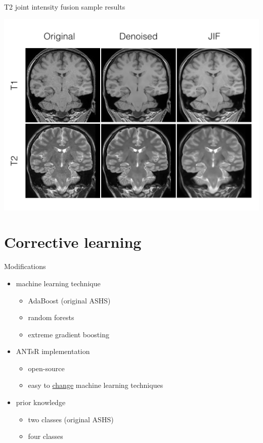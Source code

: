\documentclass[ignorenonframetext,]{beamer}
\providecommand{\tightlist}{%
\setlength{\itemsep}{0pt}\setlength{\parskip}{0pt}}
\begin{document}
\begin{frame}{T2 joint intensity fusion sample results}

\centering
\includegraphics[width=0.85 \textwidth]{../Figures/jifResults.png}

\end{frame}

\section{Corrective learning}\label{corrective-learning}

\begin{frame}{Modifications}

\begin{itemize}
\tightlist
\item
  machine learning technique

  \begin{itemize}
  \tightlist
  \item
    AdaBoost (original ASHS)
  \item
    random forests
  \item
    extreme gradient boosting
  \end{itemize}
\item
  ANTsR implementation

  \begin{itemize}
  \tightlist
  \item
    open-source
  \item
    easy to
    \href{https://github.com/stnava/ANTsR/blob/master/R/segmentationRefinement.R\#L375-L413}{change}
    machine learning techniques
  \end{itemize}
\item
  prior knowledge

  \begin{itemize}
  \tightlist
  \item
    two classes (original ASHS)
  \item
    four classes
  \end{itemize}
\end{itemize}

\end{frame}
\end{document}
